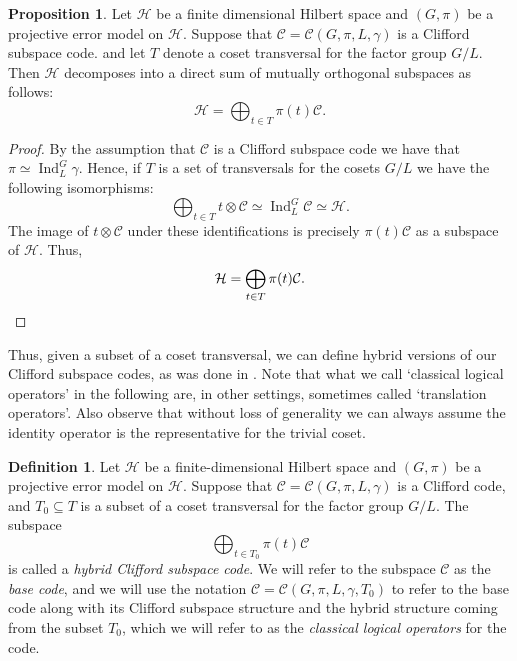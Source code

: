 \documentclass[11pt]{article}
\theoremstyle{definition}
\newtheorem{definition}{Definition}
\newtheorem{proposition}{Proposition}
\newcommand{\calC}{\mathcal{C}}
\newcommand{\calH}{\mathcal{H}}
\newcommand{\Ind}{\operatorname{Ind}}
\begin{document}
\begin{proposition}\label{prop:Hybrid structure of Clifford codes}
    Let $\calH$ be a finite dimensional Hilbert space and $(G,\pi)$ be a projective error model on $\calH$. Suppose that $\calC = \calC(G,\pi,L,\gamma)$ is a Clifford subspace code. and let $T$ denote a coset transversal for the factor group $G/L$. Then $\calH$ decomposes into a direct sum of mutually orthogonal subspaces as follows:
    \begin{equation*}
        \calH = \bigoplus_{t \in T} \pi(t)\calC.
    \end{equation*}
\end{proposition}
\begin{proof}
    By the assumption that $\calC$ is a Clifford subspace code we have that $\pi \simeq \Ind_L^G\gamma$. Hence, if $T$ is a set of transversals for the cosets $G/L$ we have the following isomorphisms:
    \begin{equation*}
        \bigoplus_{t \in T} t \otimes \calC
        \simeq \Ind_L^G\calC
        \simeq \calH.
    \end{equation*}
    The image of $t \otimes \calC$ under these identifications is precisely $\pi(t) \calC$ as a subspace of $\calH$. Thus,
    \begin{equation*}
        \calH = \bigoplus_{t \in T} \pi(t)\calC. \qedhere
    \end{equation*}
\end{proof}

Thus, given a subset of a coset transversal, we can define hybrid versions of our Clifford subspace codes, as was done in \cite{DauphinaiKribsVasmer2024}. Note that what we call `classical logical operators' in the following are, in other settings, sometimes called `translation operators'. Also observe that without loss of generality we can always assume the identity operator is the representative for the trivial coset. 

\begin{definition}\label{def:hybrid Clifford code}
    Let $\calH$ be a finite-dimensional Hilbert space and $(G,\pi)$ be a projective error model on $\calH$. Suppose that $\calC = \calC(G,\pi,L,\gamma)$ is a Clifford code, and $T_0 \subseteq T$ is a subset of a coset transversal for the factor group $G/L$. The subspace
    \[
        \bigoplus_{t\in T_0} \pi(t) \calC
    \]
    is called a \emph{hybrid Clifford subspace code}. We will refer to the subspace $\calC$ as the \emph{base code}, and we will use the notation $\calC = \calC(G,\pi,L,\gamma,T_0)$ to refer to the base code along with its Clifford subspace structure and the hybrid structure coming from the subset $T_0$, which we will refer to as the {\it classical logical operators} for the code.
\end{definition}
\end{document}
